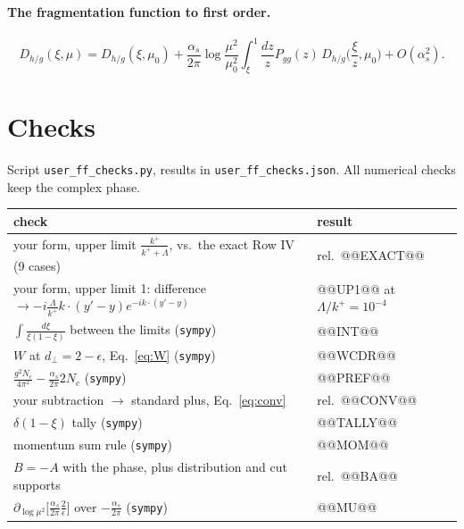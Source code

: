 \documentclass[10pt]{article}
\numberwithin{equation}{section}
\begin{document}
\paragraph{The fragmentation function to first order.}
\begin{equation}
D_{h/g}(\xi,\mu)=D_{h/g}(\xi,\mu_0)+\frac{\alpha_s}{2\pi}\log\frac{\mu^2}{\mu_0^2}\int_\xi^1\frac{dz}{z}P_{gg}(z)\,D_{h/g}\Big(\frac{\xi}{z},\mu_0\Big)+O(\alpha_s^2).
\end{equation}

\section{Checks}
Script \texttt{user\_ff\_checks.py}, results in \texttt{user\_ff\_checks.json}. All numerical checks keep the complex phase.
\begin{center}\small
\begin{tabular}{@{}p{}p{}@{}}\toprule
check & result\\\midrule
your form, upper limit $\frac{k^+}{k^++\Lambda}$, vs.\ the exact Row IV (9 cases) & rel.\ @@EXACT@@\\
your form, upper limit 1: difference $\to-i\frac{\Lambda}{k^+}k\cdot(y'-y)e^{-ik\cdot(y'-y)}$ & @@UP1@@ at $\Lambda/k^+=10^{-4}$\\
$\int\frac{d\xi}{\xi(1-\xi)}$ between the limits (\texttt{sympy}) & @@INT@@\\
$W$ at $d_\perp=2-\epsilon$, Eq.~\eqref{eq:W} (\texttt{sympy}) & @@WCDR@@\\
$\frac{g^2N_c}{4\pi^2}-\frac{\alpha_s}{2\pi}2N_c$ (\texttt{sympy}) & @@PREF@@\\
your subtraction $\to$ standard plus, Eq.~\eqref{eq:conv} & rel.\ @@CONV@@\\
$\delta(1-\xi)$ tally (\texttt{sympy}) & @@TALLY@@\\
momentum sum rule (\texttt{sympy}) & @@MOM@@\\
$B=-A$ with the phase, plus distribution and cut supports & rel.\ @@BA@@\\
$\partial_{\log\mu^2}\big[\frac{\alpha_s}{2\pi}\frac{2}{\epsilon}\big]$ over $-\frac{\alpha_s}{2\pi}$ (\texttt{sympy}) & @@MU@@\\\bottomrule
\end{tabular}
\end{center}
\end{document}
